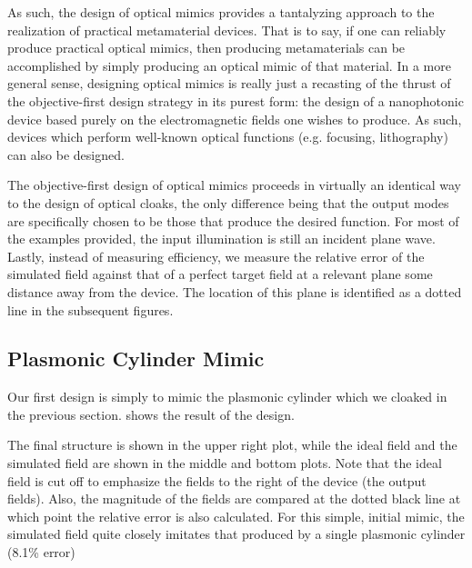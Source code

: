 As such, the design of optical mimics provides a tantalyzing approach
    to the realization of practical metamaterial devices.
That is to say, if one can reliably produce practical optical mimics,
    then producing metamaterials can be accomplished by 
    simply producing an optical mimic of that material.
In a more general sense, 
    designing optical mimics is really just a recasting of the thrust of 
    the objective-first design strategy in its purest form:
    the design of a nanophotonic device based purely 
    on the electromagnetic fields one wishes to produce.
As such, devices which perform well-known optical functions
    (e.g. focusing, lithography) can also be designed.                
                
                
                
%                 
The objective-first design of optical mimics proceeds in virtually
    an identical way to the design of optical cloaks,
    the only difference being that the output modes are 
    specifically chosen to be those that produce the desired function.
For most of the examples provided, the input illumination is still an incident plane wave.
Lastly, instead of measuring efficiency, 
    we measure the relative error of the simulated field
    against that of a perfect target field
    at a relevant plane some distance away from the device.
The location of this plane is identified as a dotted line in the subsequent figures.                
                
                

\subsection{Plasmonic Cylinder Mimic}

Our first design is simply to mimic the plasmonic cylinder 
    which we cloaked in the previous section.
 shows the result of the design.

The final structure is shown in the upper right plot,
    while the ideal field and the simulated field
    are shown in the middle and bottom plots.
Note that the ideal field is cut off to emphasize 
    the fields to the right of the device (the output fields).
Also, the magnitude of the fields are compared at the 
    dotted black line at which point the relative error
    is also calculated.
For this simple, initial mimic, the simulated field
    quite closely imitates that produced by a single plasmonic cylinder (8.1\% error)
    
